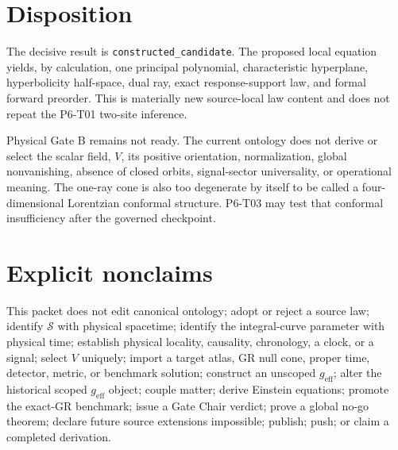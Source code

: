\documentclass[11pt]{article}
\newcommand{\Sub}{\mathcal S}
\begin{document}
\section{Disposition}

The decisive result is \texttt{constructed\_candidate}.  The proposed local
equation yields, by calculation, one principal polynomial, characteristic
hyperplane, hyperbolicity half-space, dual ray, exact response-support law,
and formal forward preorder.  This is materially new source-local law content
and does not repeat the P6-T01 two-site inference.

Physical Gate B remains not ready.  The current ontology does not derive or
select the scalar field, \(V\), its positive orientation, normalization,
global nonvanishing, absence of closed orbits, signal-sector universality, or
operational meaning.  The one-ray cone is also too degenerate by itself to be
called a four-dimensional Lorentzian conformal structure.  P6-T03 may test
that conformal insufficiency after the governed checkpoint.

\section{Explicit nonclaims}

This packet does not edit canonical ontology; adopt or reject a source law;
identify \(\Sub\) with physical spacetime; identify the integral-curve
parameter with physical time; establish physical locality, causality,
chronology, a clock, or a signal; select \(V\) uniquely; import a target
atlas, GR null cone, proper time, detector, metric, or benchmark solution;
construct an unscoped \(g_{\mathrm{eff}}\); alter the historical scoped
\(g_{\mathrm{eff}}\) object; couple matter; derive Einstein equations;
promote the exact-GR benchmark; issue a Gate Chair verdict; prove a global
no-go theorem; declare future source extensions impossible; publish; push; or
claim a completed derivation.
\end{document}
